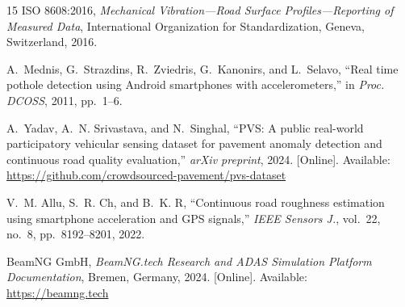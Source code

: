 \documentclass[conference]{IEEEtran}
\begin{document}
\begin{thebibliography}{15}
ISO 8608:2016, \emph{Mechanical Vibration—Road Surface Profiles—Reporting of Measured Data}, International Organization for Standardization, Geneva, Switzerland, 2016.

A.~Mednis, G.~Strazdins, R.~Zviedris, G.~Kanonirs, and L.~Selavo, ``Real time pothole detection using Android smartphones with accelerometers,'' in \emph{Proc. DCOSS}, 2011, pp.~1--6.

A.~Yadav, A.~N. Srivastava, and N.~Singhal, ``PVS: A public real-world participatory vehicular sensing dataset for pavement anomaly detection and continuous road quality evaluation,'' \emph{arXiv preprint}, 2024. [Online]. Available: \url{https://github.com/crowdsourced-pavement/pvs-dataset}

V.~M. Allu, S.~R. Ch, and B.~K. R, ``Continuous road roughness estimation using smartphone acceleration and GPS signals,'' \emph{IEEE Sensors J.}, vol.~22, no.~8, pp.~8192--8201, 2022.

BeamNG GmbH, \emph{BeamNG.tech Research and ADAS Simulation Platform Documentation}, Bremen, Germany, 2024. [Online]. Available: \url{https://beamng.tech}

\end{thebibliography}
\end{document}
